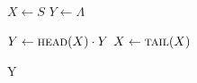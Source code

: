 
\begin{algorithm}[H]
  \begin{algorithmic}[1]
      \State {}
      \State $X \gets S$
      \State $Y \gets \Lambda$
      
      \hStatex
      \State {}
      \State {}
        \State $Y \gets \Call{head}{X} \cdot Y$
        \State $X \gets \Call{tail}{X}$
      \EndWhile
      \State {}
      
      \hStatex
      \State \Return Y
    \EndProcedure
  \end{algorithmic}
\end{algorithm}